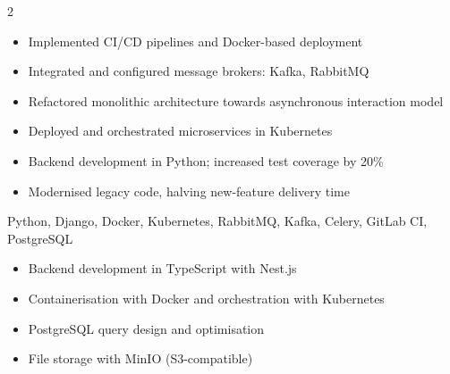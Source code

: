 \documentclass[10pt,a4paper,ragged2e,withhyper]{altacv}
\begin{document}
\begin{paracol}{2}
\divider

\begin{itemize}
  \item Implemented CI/CD pipelines and Docker-based deployment
  \item Integrated and configured message brokers: Kafka, RabbitMQ
  \item Refactored monolithic architecture towards asynchronous interaction model
  \item Deployed and orchestrated microservices in Kubernetes
  \item Backend development in Python; increased test coverage by 20\%
  \item Modernised legacy code, halving new-feature delivery time
\end{itemize}
Python, Django, Docker, Kubernetes, RabbitMQ, Kafka, Celery, GitLab CI, PostgreSQL

\divider

\begin{itemize}
  \item Backend development in TypeScript with Nest.js
  \item Containerisation with Docker and orchestration with Kubernetes
  \item PostgreSQL query design and optimisation
  \item File storage with MinIO (S3-compatible)
\end{itemize}

\switchcolumn






\divider\smallskip



\divider\smallskip



\end{paracol}
\end{document}
